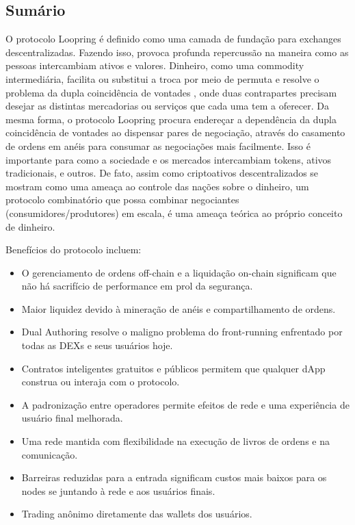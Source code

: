 \documentclass[UTF8,nofonts]{article}
\begin{document}
\begin{multicols}{2}
\section{Sumário}
O protocolo Loopring é definido como uma camada de fundação para exchanges descentralizadas. Fazendo isso, provoca profunda repercussão na maneira como as pessoas intercambiam ativos e valores. Dinheiro, como uma commodity intermediária, facilita ou substitui a troca por meio de permuta e resolve o problema da dupla coincidência de vontades \cite{unenumerated2006}, onde duas contrapartes precisam desejar as distintas mercadorias ou serviços que cada uma tem a oferecer. Da mesma forma, o protocolo Loopring procura endereçar a dependência da dupla coincidência de vontades ao dispensar pares de negociação, através do casamento de ordens em anéis para consumar as negociações mais facilmente. Isso é importante para como a sociedade e os mercados intercambiam tokens, ativos tradicionais, e outros. De fato, assim como criptoativos descentralizados se mostram como uma ameaça ao controle das nações sobre o dinheiro, um protocolo combinatório que possa combinar negociantes (consumidores/produtores) em escala, é uma ameaça teórica ao próprio conceito de dinheiro.

Benefícios do protocolo incluem:
\begin{itemize}
\item O gerenciamento de ordens off-chain e a liquidação on-chain significam que não há sacrifício de performance em prol da segurança.
\item Maior liquidez devido à mineração de anéis e compartilhamento de ordens.
\item Dual Authoring resolve o maligno problema do front-running enfrentado por todas as DEXs e seus usuários hoje.
\item Contratos inteligentes gratuitos e públicos permitem que qualquer dApp construa ou interaja com o protocolo.
\item A padronização entre operadores permite efeitos de rede e uma experiência de usuário final melhorada.
\item Uma rede mantida com flexibilidade na execução de livros de ordens e na comunicação.
\item Barreiras reduzidas para a entrada significam custos mais baixos para os nodes se juntando à rede e aos usuários finais.
\item Trading anônimo diretamente das wallets dos usuários.
\end{itemize}


\end{multicols}
\end{document}
